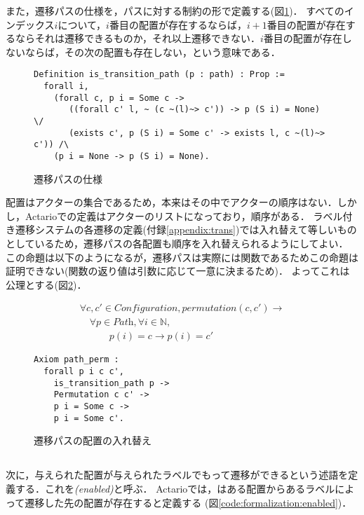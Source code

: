 また，遷移パスの仕様を，パスに対する制約の形で定義する(図\ref{code:formalization:path-spec})．
すべてのインデックス$i$について，$i$番目の配置が存在するならば，$i+1$番目の配置が存在するならそれは遷移できるものか，それ以上遷移できない．$i$番目の配置が存在しないならば，その次の配置も存在しない，という意味である．

\begin{figure}[tp]
\begin{lstlisting}
Definition is_transition_path (p : path) : Prop :=
  forall i,
    (forall c, p i = Some c ->
       ((forall c' l, ~ (c ~(l)~> c')) -> p (S i) = None) \/
       (exists c', p (S i) = Some c' -> exists l, c ~(l)~> c')) /\
    (p i = None -> p (S i) = None).
\end{lstlisting}
  \caption{遷移パスの仕様}\label{code:formalization:path-spec}
\end{figure}

配置はアクターの集合であるため，本来はその中でアクターの順序はない．しかし，Actarioでの定義はアクターのリストになっており，順序がある．
ラベル付き遷移システムの各遷移の定義(付録\ref{appendix:trans})では入れ替えて等しいものとしているため，遷移パスの各配置も順序を入れ替えられるようにしてよい．
この命題は以下のようになるが，遷移パスは実際には関数であるためこの命題は証明できない(関数の返り値は引数に応じて一意に決まるため)．
よってこれは公理とする(図\ref{code:proof:path-perm})．

\begin{displaymath}
  \begin{array}{l}
    \forall c, c' \in \textit{Configuration}, permutation(c, c') \rightarrow \\
    \quad \forall p \in \textit{Path}, \forall i \in \mathbb{N}, \\
    \quad \quad \quad p(i) = c \rightarrow p(i) = c'
  \end{array}
\end{displaymath}

\begin{figure}[tp]
\begin{lstlisting}
Axiom path_perm :
  forall p i c c',
    is_transition_path p ->
    Permutation c c' ->
    p i = Some c ->
    p i = Some c'.
\end{lstlisting}
  \caption{遷移パスの配置の入れ替え}\label{code:proof:path-perm}
\end{figure}

\subsection{\enabled}
次に，与えられた配置が与えられたラベルでもって遷移ができるという述語を定義する．これを\emph{\enabled (enabled)}と呼ぶ．
Actarioでは，\enabled はある配置からあるラベルによって遷移した先の配置が存在すると定義する (図\ref{code:formalization:enabled})．

